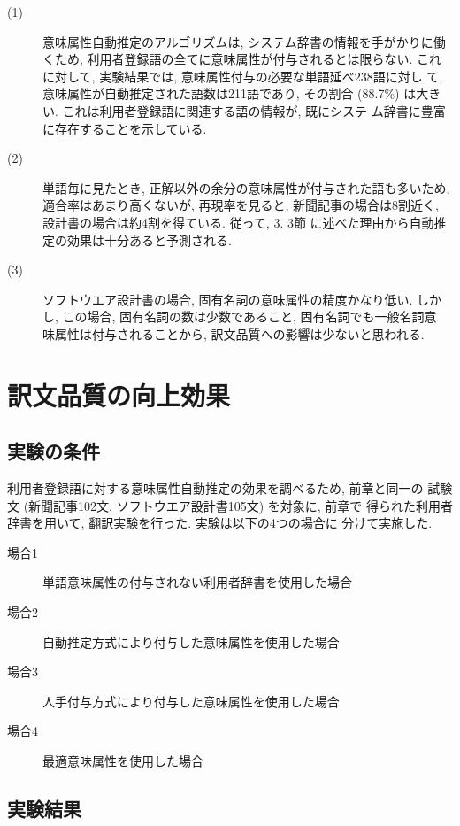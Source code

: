 \begin{description}
\item[(1)] 意味属性自動推定のアルゴリズムは, システム辞書の情報を手がかりに働
くため, 利用者登録語の全てに意味属性が付与されるとは限らない. これ
に対して, 実験結果では, 意味属性付与の必要な単語延べ238語に対し
て, 意味属性が自動推定された語数は211語であり, その割合 (88.7\%) 
は大きい. これは利用者登録語に関連する語の情報が, 既にシステ
ム辞書に豊富に存在することを示している.  \vspace*{-0.2mm}
\item[(2)] 単語毎に見たとき, 正解以外の余分の意味属性が付与された語も多いため, 
適合率はあまり高くないが, 再現率を見ると, 新聞記事の場合は8割近く, 
設計書の場合は約4割を得ている. 従って, 3. 3節
に述べた理由から自動推定の効果は十分あると予測される. 
\item[(3)] ソフトウエア設計書の場合, 固有名詞の意味属性の精度かなり低い. しか
し, この場合, 固有名詞の数は少数であること, 固有名詞でも一般名詞意
味属性は付与されることから, 訳文品質への影響は少ないと思われる. 
\end{description}


\section{訳文品質の向上効果}
\label{sec:5}

\subsection{実験の条件}
\label{sec:5.1}

利用者登録語に対する意味属性自動推定の効果を調べるため, 前章と同一の
試験文 (新聞記事102文, ソフトウエア設計書105文) を対象に, 前章で
得られた利用者辞書を用いて, 翻訳実験を行った. 実験は以下の4つの場合に
分けて実施した.  
\begin{description}
\item[場合1] 単語意味属性の付与されない利用者辞書を使用した場合
\item[場合2] 自動推定方式により付与した意味属性を使用した場合
\item[場合3] 人手付与方式により付与した意味属性を使用した場合
\item[場合4] 最適意味属性を使用した場合
\end{description}


\subsection{実験結果}
\label{sec:5.2}

